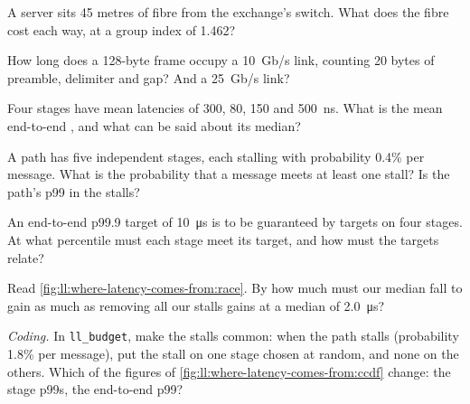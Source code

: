 \begin{exercise}[$\star$]\label{exo:ll:where-latency-comes-from:1}
A server sits 45 metres of fibre from the exchange's switch. What does the fibre cost each way, at a group index of
1.462?
\end{exercise}

\begin{exercise}[$\star$]\label{exo:ll:where-latency-comes-from:2}
How long does a 128-byte frame occupy a 10~Gb/s link, counting 20 bytes of preamble, delimiter and gap? And a 25~Gb/s
link?
\end{exercise}

\begin{exercise}[$\star$]\label{exo:ll:where-latency-comes-from:3}
Four stages have mean latencies of 300, 80, 150 and \qty{500}{\nano\second}. What is the mean end-to-end , and
what can be said about its median?
\end{exercise}

\begin{exercise}[$\star\star$]\label{exo:ll:where-latency-comes-from:4}
A path has five independent stages, each stalling with probability 0.4\% per message. What is the probability that a
message meets at least one stall? Is the path's p99 in the stalls?
\end{exercise}

\begin{exercise}[$\star\star$]\label{exo:ll:where-latency-comes-from:5}
An end-to-end p99.9 target of \qty{10}{\micro\second} is to be guaranteed by targets on four stages. At what
percentile must each stage meet its target, and how must the targets relate?
\end{exercise}

\begin{exercise}[$\star\star$]\label{exo:ll:where-latency-comes-from:6}
Read \cref{fig:ll:where-latency-comes-from:race}. By how much must our median fall to gain as much as removing all
our stalls gains at a median of \qty{2.0}{\micro\second}?
\end{exercise}

\begin{exercise}[$\star\star\star$]\label{exo:ll:where-latency-comes-from:7}
\emph{Coding.} In \texttt{ll\_budget}, make the stalls common: when the path stalls (probability 1.8\% per message),
put the stall on one stage chosen at random, and none on the others. Which of the figures of
\cref{fig:ll:where-latency-comes-from:ccdf} change: the stage p99s, the end-to-end p99?
\end{exercise}

